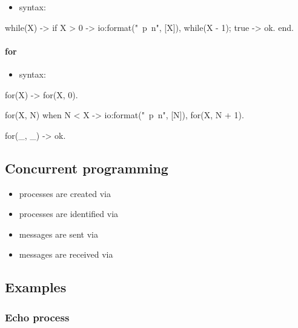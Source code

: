 \documentclass[a4paper,landscape,10pt]{article}
\begin{document}
\begin{multicols*}{2}
  \begin{itemize}
    \item syntax: 
  \end{itemize}

  \begin{erlang}
while(X) ->
  if
    X > 0 ->
      io:format("~p~n", [X]),
      while(X - 1);
    true ->
      ok.
end.
\end{erlang}

  \breakcolumn

  \paragraph{for}

  \begin{itemize}
    \item syntax: 
  \end{itemize}

  \begin{erlang}
for(X) ->
  for(X, 0).

for(X, N) when N < X ->
  io:format("~p~n", [N]),
  for(X, N + 1).

for(_, _) ->
  ok.
  \end{erlang}

  \subsection{Concurrent programming}

  \begin{itemize}
    \item processes are created via 
    \item processes are identified via 
    \item messages are sent via 
    \item messages are received via 
  \end{itemize}

  \breakcolumn

  \subsection{Examples}

  \subsubsection{Echo process}


\end{multicols*}
\end{document}
